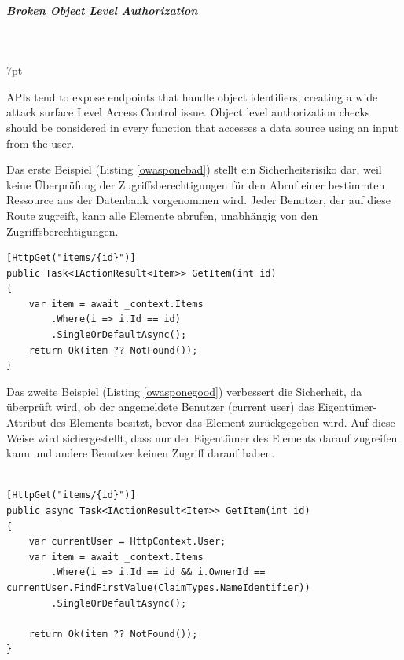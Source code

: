 \documentclass[notitlepage, hidelinks]{article}
\newenvironment{formal}{%
  \def\FrameCommand{%
    \hspace{1pt}%
    {\color{black}\vrule width 2pt}%
    {\color{formalshade}\vrule width 4pt}%
    \colorbox{formalshade}%
  }%
  \MakeFramed{\advance\hsize-\width\FrameRestore}%
  \noindent\hspace{-4.55pt}%
  \begin{adjustwidth}{}{7pt}%
  \vspace{2pt}\vspace{2pt}%
}
{%
  \vspace{2pt}\end{adjustwidth}\endMakeFramed%
}
\begin{document}
\subparagraph{Broken Object Level Authorization} \mbox{} \\

\begin{formal}
APIs tend to expose endpoints that handle object identifiers, creating a wide attack surface Level Access Control issue. Object level authorization checks should be considered in every function that accesses a data source using an input from the user.
\end{formal}

Das erste Beispiel (Listing \ref{owasponebad}) stellt ein Sicherheitsrisiko dar, weil keine Überprüfung der Zugriffsberechtigungen für den Abruf einer bestimmten Ressource aus der Datenbank vorgenommen wird. Jeder Benutzer, der auf diese Route zugreift, kann alle Elemente abrufen, unabhängig von den Zugriffsberechtigungen.

\begin{lstlisting}[language={[Sharp]C},frame=single,caption=Negativbeispiel Broken Object Level Authorization,label=owasponebad]
[HttpGet("items/{id}")] 
public Task<IActionResult<Item>> GetItem(int id) 
{ 
	var item = await _context.Items
        .Where(i => i.Id == id)
        .SingleOrDefaultAsync();
    return Ok(item ?? NotFound());
}
\end{lstlisting}

Das zweite Beispiel (Listing \ref{owasponegood}) verbessert die Sicherheit, da überprüft wird, ob der angemeldete Benutzer (current user) das Eigentümer-Attribut des Elements besitzt, bevor das Element zurückgegeben wird. Auf diese Weise wird sichergestellt, dass nur der Eigentümer des Elements darauf zugreifen kann und andere Benutzer keinen Zugriff darauf haben.

\begin{lstlisting}[language={[Sharp]C},frame=single,caption=Positivbeispiel Broken Object Level Authorization,label=owasponegood]

[HttpGet("items/{id}")]
public async Task<IActionResult<Item>> GetItem(int id)
{
    var currentUser = HttpContext.User;
    var item = await _context.Items
        .Where(i => i.Id == id && i.OwnerId == currentUser.FindFirstValue(ClaimTypes.NameIdentifier))
        .SingleOrDefaultAsync();

    return Ok(item ?? NotFound());
}
\end{lstlisting}
\end{document}
